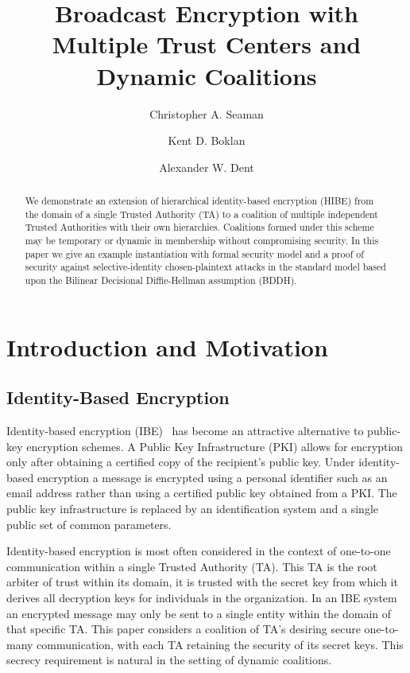 \documentclass[10pt]{llncs}
\title{Broadcast Encryption with Multiple Trust Centers and Dynamic Coalitions}
\author{Christopher A. Seaman\inst{1} \and
        Kent D. Boklan\inst{2} \and
        Alexander W. Dent\inst{3}}
\institute{Graduate Center, City University of New York, USA \and
            Queens College, City University of New York, USA \and
            Royal Holloway, University of London, UK}
\begin{document}
\maketitle

\begin{abstract}
We demonstrate an extension of hierarchical identity-based
encryption (HIBE) from the domain of a single Trusted Authority (TA)
to a coalition of multiple independent Trusted Authorities with
their own hierarchies.  Coalitions formed under this scheme may be
temporary or dynamic in membership without compromising security. In
this paper we give an example instantiation with formal security
model and a proof of security against selective-identity
chosen-plaintext attacks in the standard model based upon the
Bilinear Decisional Diffie-Hellman assumption (BDDH).
\end{abstract}


\section{Introduction and Motivation}
\subsection{Identity-Based Encryption}
Identity-based encryption (IBE)~\cite{Shamir84} has become an
attractive alternative to public-key encryption schemes. A Public
Key Infrastructure (PKI) allows for encryption only after obtaining
a certified copy of the recipient's public key. Under identity-based
encryption a message is encrypted using a personal identifier such
as an email address rather than using a certified public key
obtained from a PKI. The public key infrastructure is replaced by an
identification system and a single public set of common parameters.

Identity-based encryption is most often considered in the context of
one-to-one communication within a single Trusted Authority (TA).
This TA is the root arbiter of trust within its domain, it is
trusted with the secret key from which it derives all decryption
keys for individuals in the organization. In an IBE system an
encrypted message may only be sent to a single entity within the
domain of that specific TA. This paper considers a coalition of TA's
desiring secure one-to-many communication, with each TA retaining
the security of its secret keys.  This secrecy requirement is
natural in the setting of dynamic coalitions.
\end{document}
